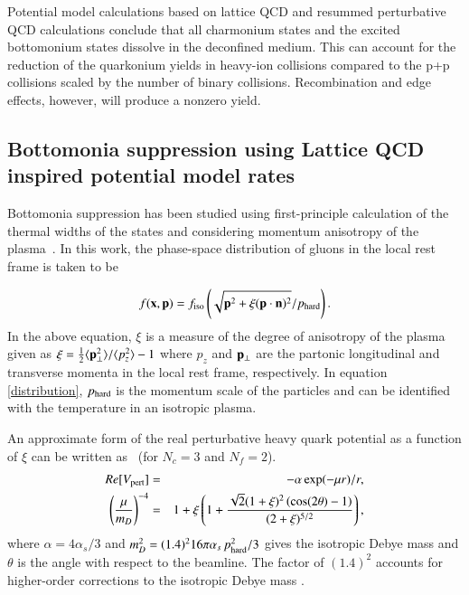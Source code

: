 Potential model calculations based on lattice QCD and resummed 
perturbative QCD calculations conclude that all charmonium states and the
excited bottomonium states dissolve in the deconfined medium.
This can account  
for the reduction of the quarkonium yields in heavy-ion collisions 
compared to the p+p collisions scaled by the number of binary collisions.
Recombination and edge effects, however, will produce a nonzero yield.

              
\subsection{Bottomonia suppression using Lattice QCD inspired potential model rates}

Bottomonia suppression has been studied using first-principle
calculation of the thermal widths of the states and considering 
momentum anisotropy of the plasma~\cite{Strickland:2011aa,Krouppa:2016jcl,Krouppa:2018lkt}.
In this work, the phase-space distribution of gluons in the local
rest frame is taken to be 

\begin{equation} 
f({\bf x},{\bf p}) = f_{\rm iso}\left(\sqrt{{\bf p}^2+ \xi({\bf p}\cdot{\bf n})^2 }  / 
p_{\rm hard} \right).
\label{distribution}
\end{equation} 
In the above equation, $\xi$ is a measure of the degree of anisotropy of the plasma given as 
$\xi = \frac{1}{2} \langle 
{\bf p}_\perp^2\rangle/\langle p_z^2\rangle -1$
where $p_z$ and 
${\bf p}_\perp $ are the partonic longitudinal and transverse momenta in the local
rest frame, respectively. In equation \ref{distribution}, $p_{\rm hard}$ is the momentum  
scale of the particles and can be identified with the temperature
in an isotropic plasma. 

An approximate form of the real perturbative heavy quark potential as a function of
$\xi$ can be written as~\cite{Dumitru:2007hy} (for $N_c=3$ and $N_f=2$). 
\begin{eqnarray}
Re[V_{\rm pert}] &=& - \alpha \exp(-\mu r)/r, \nonumber \\
\left(\frac{\mu}{m_D}\right)^{-4} &=&  
1 + \xi\left(1 + \frac{\sqrt{2}(1+\xi)^2\left(\cos(2\theta) - 1 \right)}{(2+ \xi)^{5/2}} \right),
\label{eq:muparam}
\end{eqnarray}
where $\alpha = 4\alpha_s/3$ and $m_D^2 = (1.4)^2 16 \pi \alpha_s  \, p_{\rm hard}^2/3$ gives
the isotropic Debye mass and $\theta$ is the angle with respect to the beamline.  
The factor of $(1.4)^2$ accounts for higher-order corrections to the isotropic Debye 
mass \cite{Kaczmarek:2004gv}.

